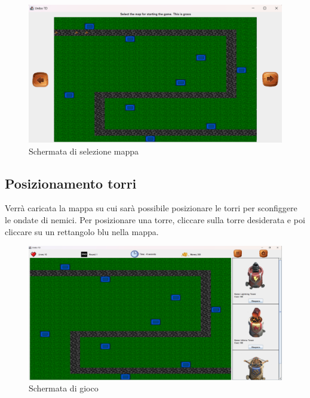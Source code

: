 \documentclass[a4paper,12pt]{report}
\begin{document}
\begin{figure}[H]
    \centering
    \includegraphics[scale=0.6]{map}
    \caption{Schermata di selezione mappa}
    \label{fig:map}
\end{figure}

\subsection{Posizionamento torri}
Verrà caricata la mappa su cui sarà possibile posizionare le torri per sconfiggere le ondate di nemici. Per posizionare una torre, cliccare sulla torre desiderata e poi cliccare su un rettangolo blu nella mappa.

\begin{figure}[H]
    \centering
    \includegraphics[scale=0.4]{PosizionamentoTorri}
    \caption{Schermata di gioco}
    \label{fig:gamePlay}
\end{figure}
\end{document}
